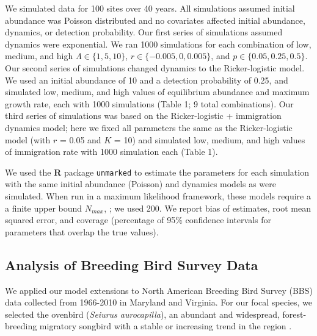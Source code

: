 \documentclass[12pt,english]{article}
\begin{document}
\begin{spacing}{1.9}
\begin{flushleft}
We simulated data for 100 sites over 40 years.  All
simulations assumed initial abundance was Poisson distributed
and no covariates affected initial abundance, dynamics, or
detection probability.  Our first series of simulations
assumed dynamics were exponential.  We ran 1000 simulations for
each combination of low, medium, and high $\Lambda \in
\{1,5,10\}$, $r \in \{-0.005, 0, 0.005\}$, and
$p \in \{0.05, 0.25, 0.5\}$. %
Our second series of simulations changed dynamics to the Ricker-logistic
model. We used an initial abundance of 10 and a detection probability
of 0.25, and simulated low, medium, and high values of equilibrium
abundance and maximum growth rate, each with 1000 simulations (Table 1;
9 total combinations). Our third series of simulations was based
on the Ricker-logistic + immigration dynamics model; here we fixed all
parameters the same as the Ricker-logistic model (with $r$ = 0.05 and $K$ = 10) and
simulated low, medium, and high values of immigration rate with 1000
simulation each (Table 1).

We used the \textbf{R} package \texttt{unmarked} to estimate the parameters 
for each simulation with the same
initial abundance (Poisson) and dynamics models as were simulated.
When run in a maximum likelihood framework, these models require a
a finite upper bound $N_{max}$,
\citep{royle:2004biom,dail_madsen:2011};
we used 200.  We report bias of estimates, root
mean squared error, and coverage (percentage of 95\% confidence
intervals for parameters that overlap the true values).

\subsection*{Analysis of Breeding Bird Survey Data}

We applied our model extensions to North American Breeding Bird Survey
(BBS) data collected from 1966-2010 in %
Maryland and Virginia. For our focal species, we selected the
ovenbird (\textit{Seiurus aurocapilla}), an abundant and widespread,
forest-breeding migratory songbird with a stable or increasing trend
in the region \citep{porneluzi_etal:2011}. 


\end{flushleft}
\end{spacing}
\end{document}
